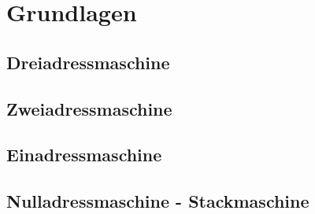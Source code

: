 \section{Grundlagen}

\subsection{Dreiadressmaschine}
\subsection{Zweiadressmaschine}
\subsection{Einadressmaschine}
\subsection{Nulladressmaschine - Stackmaschine}

